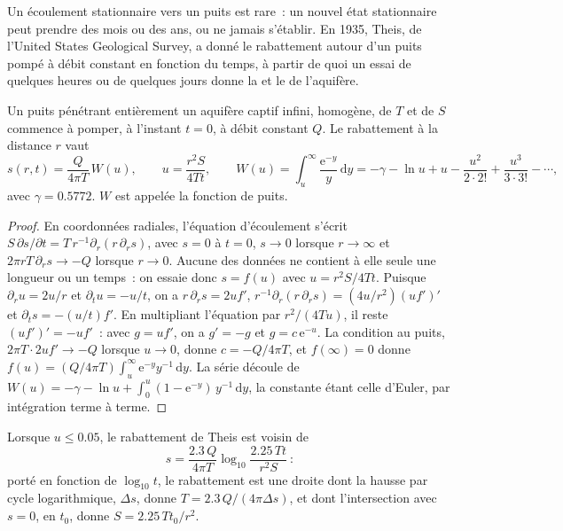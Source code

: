 Un écoulement stationnaire vers un puits est rare~: un nouvel état stationnaire peut prendre des mois ou des
ans, ou ne jamais s'établir. En 1935, Theis, de l'United States Geological
Survey, a donné le rabattement autour d'un puits pompé à débit constant en
fonction du temps, à partir de quoi un essai de quelques heures ou de quelques jours donne la
 et le  de l'aquifère.

\begin{theorem}\label{thm:b3:hydrogeology:theis}
Un puits pénétrant entièrement un aquifère captif infini, homogène, de
 $T$ et de  $S$ commence à pomper, à l'instant $t = 0$, à
débit constant $Q$. Le rabattement à la distance $r$ vaut
\[
s(r, t) = \frac{Q}{4\pi T}\,W(u), \qquad u = \frac{r^2S}{4Tt}, \qquad
W(u) = \int_u^\infty\frac{\mathrm e^{-y}}{y}\,\mathrm dy = -\gamma - \ln u +
u - \frac{u^2}{2\cdot2!} + \frac{u^3}{3\cdot3!} - \cdots,
\]
avec $\gamma = \num{0.5772}$. $W$ est appelée la fonction de puits.
\end{theorem}

\begin{proof}
En coordonnées radiales, l'équation d'écoulement s'écrit $S\,\partial s/\partial t =
T\,r^{-1}\partial_r(r\,\partial_rs)$, avec $s = 0$ à $t = 0$, $s \to 0$ lorsque
$r \to \infty$ et $2\pi rT\,\partial_rs \to -Q$ lorsque $r \to 0$. Aucune des
données ne contient à elle seule une longueur ou un temps~: on essaie donc $s = f(u)$ avec $u =
r^2S/4Tt$. Puisque $\partial_ru = 2u/r$ et $\partial_tu = -u/t$, on a $r\,\partial_rs =
2uf'$, $r^{-1}\partial_r(r\,\partial_rs) = (4u/r^2)(uf')'$ et $\partial_ts =
-(u/t)f'$. En multipliant l'équation par $r^2/(4Tu)$, il reste $(uf')' = -uf'$~:
avec $g = uf'$, on a $g' = -g$ et $g = c\,\mathrm e^{-u}$. La condition au puits, $2\pi T\cdot2uf' \to -Q$ lorsque $u \to 0$, donne $c =
-Q/4\pi T$, et $f(\infty) = 0$ donne $f(u) = (Q/4\pi T)\int_u^\infty
\mathrm e^{-y}y^{-1}\,\mathrm dy$. La série découle de
$W(u) = -\gamma - \ln u + \int_0^u(1 - \mathrm e^{-y})\,y^{-1}\,\mathrm dy$,
la constante étant celle d'Euler, par intégration terme à terme.
\end{proof}

\begin{proposition}\label{prop:b3:hydrogeology:cooper-jacob}
Lorsque $u \le 0.05$, le rabattement de Theis est voisin de
\[
s = \frac{2.3\,Q}{4\pi T}\log_{10}\frac{2.25\,Tt}{r^2S}~:
\]
porté en fonction de $\log_{10}t$, le rabattement est une droite dont la hausse
par cycle logarithmique, $\Delta s$, donne $T = 2.3\,Q/(4\pi\Delta s)$, et dont
l'intersection avec $s = 0$, en $t_0$, donne $S = 2.25\,Tt_0/r^2$.
\end{proposition}

